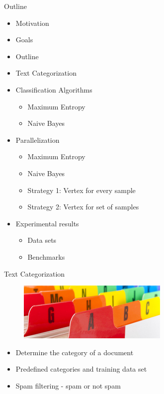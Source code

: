 \documentclass{beamer}
\begin{document}
\begin{frame}{Outline}

\begin{itemize}
 \item Motivation
 \item Goals
 \item Outline
 \item Text Categorization
 \item Classification Algorithms
	\begin{itemize}
	\item  Maximum Entropy
	\item  Naive Bayes
	\end{itemize}
 \item Parallelization
	\begin{itemize}
	\item  Maximum Entropy
	\item  Naive Bayes
	\item  Strategy 1: Vertex for every sample
	\item  Strategy 2: Vertex for set of samples
	\end{itemize}
 \item Experimental results
	\begin{itemize}
	\item Data sets
	\item Benchmarks
	\end{itemize}
\end{itemize}

\end{frame}


\begin{frame}{Text Categorization}

\begin{figure}[!htb]
  \centering
  \includegraphics[scale=0.6]{presentation/text_categorization.jpg}
\end{figure}

\begin{itemize}
 \item Determine the category of a document
 \item Predefined categories and training data set
 \item Spam filtering - spam or not spam
\end{itemize}

\end{frame}
\end{document}
